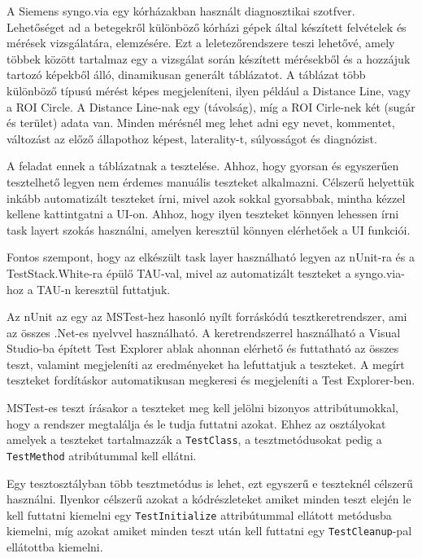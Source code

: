 A Siemens syngo.via egy kórházakban használt diagnosztikai szotfver. Lehetőséget ad a betegekről különböző kórházi gépek által készített felvételek és mérések vizsgálatára, elemzésére. Ezt a leletezőrendszere teszi lehetővé, amely többek között tartalmaz egy a vizsgálat során készített mérésekből és a hozzájuk tartozó képekből álló, dinamikusan generált táblázatot. A táblázat több különböző típusú mérést képes megjeleníteni, ilyen például a Distance Line, vagy a ROI Circle. A Distance Line-nak egy (távolság), míg a ROI Cirle-nek két (sugár és terület) adata van. Minden mérésnél meg lehet adni egy nevet, kommentet, változást az előző állapothoz képest, laterality-t, súlyosságot és diagnózist.

\noindent A feladat ennek a táblázatnak a tesztelése. Ahhoz, hogy gyorsan és egyszerűen tesztelhető legyen nem érdemes manuális teszteket alkalmazni. Célszerű helyettük inkább automatizált teszteket írni, mivel azok sokkal gyorsabbak, mintha kézzel kellene kattintgatni a UI-on. Ahhoz, hogy ilyen teszteket könnyen lehessen írni task layert szokás használni, amelyen keresztül könnyen elérhetőek a UI funkciói.

\noindent Fontos szempont, hogy az elkészült task layer használható legyen az nUnit-ra és a TestStack.White-ra épülő TAU-val, mivel az automatizált teszteket a syngo.via-hoz a TAU-n keresztül futtatjuk.

Az nUnit  az egy az MSTest-hez hasonló nyílt forráskódú tesztkeretrendszer, ami az összes .Net-es nyelvvel használható. A keretrendszerrel használható a Visual Studio-ba épített Test Explorer ablak ahonnan elérhető és futtatható az összes teszt, valamint megjeleníti az eredményeket ha lefuttatjuk a teszteket. A megírt teszteket fordításkor automatikusan megkeresi és megjeleníti a Test Explorer-ben.

\noindent MSTest-es teszt írásakor a teszteket meg kell jelölni bizonyos attribútumokkal, hogy a rendszer megtalálja és le tudja futtatni azokat. Ehhez az osztályokat amelyek a teszteket tartalmazzák a \verb|TestClass|, a tesztmetódusokat pedig a \verb|TestMethod| atribútummal kell ellátni.

\noindent Egy tesztosztályban több tesztmetódus is lehet, ezt egyszerű e teszteknél célszerű használni. Ilyenkor célszerű azokat a kódrészleteket amiket minden teszt elején le kell futtatni kiemelni egy \verb|TestInitialize| attribútummal ellátott metódusba kiemelni, míg azokat amiket minden teszt után kell futtatni egy \verb|TestCleanup|-pal ellátottba kiemelni.

